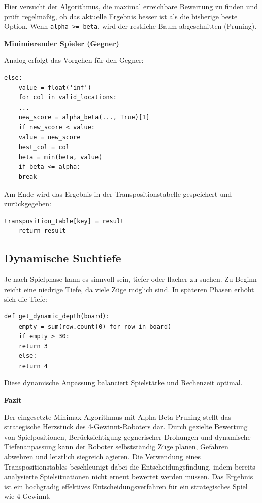 Hier versucht der Algorithmus, die maximal erreichbare Bewertung zu finden und prüft regelmäßig, ob das aktuelle Ergebnis besser ist als die bisherige beste Option. Wenn \texttt{alpha >= beta}, wird der restliche Baum abgeschnitten (Pruning).

\textbf{Minimierender Spieler (Gegner)}

Analog erfolgt das Vorgehen für den Gegner:

\begin{lstlisting}[style=pythonstyle]
	else:
	value = float('inf')
	for col in valid_locations:
	...
	new_score = alpha_beta(..., True)[1]
	if new_score < value:
	value = new_score
	best_col = col
	beta = min(beta, value)
	if beta <= alpha:
	break
\end{lstlisting}

Am Ende wird das Ergebnis in der Transpositionstabelle gespeichert und zurückgegeben:

\begin{lstlisting}[style=pythonstyle]
	transposition_table[key] = result
	return result
\end{lstlisting}

\subsection{Dynamische Suchtiefe}

Je nach Spielphase kann es sinnvoll sein, tiefer oder flacher zu suchen. Zu Beginn reicht eine niedrige Tiefe, da viele Züge möglich sind. In späteren Phasen erhöht sich die Tiefe:

\begin{lstlisting}[style=pythonstyle]
	def get_dynamic_depth(board):
	empty = sum(row.count(0) for row in board)
	if empty > 30:
	return 3
	else:
	return 4
\end{lstlisting}

Diese dynamische Anpassung balanciert Spielstärke und Rechenzeit optimal.

\textbf{Fazit}

Der eingesetzte Minimax-Algorithmus mit Alpha-Beta-Pruning stellt das strategische Herzstück des 4-Gewinnt-Roboters dar. Durch gezielte Bewertung von Spielpositionen, Berücksichtigung gegnerischer Drohungen und dynamische Tiefenanpassung kann der Roboter selbstständig Züge planen, Gefahren abwehren und letztlich siegreich agieren. Die Verwendung eines Transpositionstables beschleunigt dabei die Entscheidungsfindung, indem bereits analysierte Spielsituationen nicht erneut bewertet werden müssen. Das Ergebnis ist ein hochgradig effektives Entscheidungsverfahren für ein strategisches Spiel wie 4-Gewinnt.


